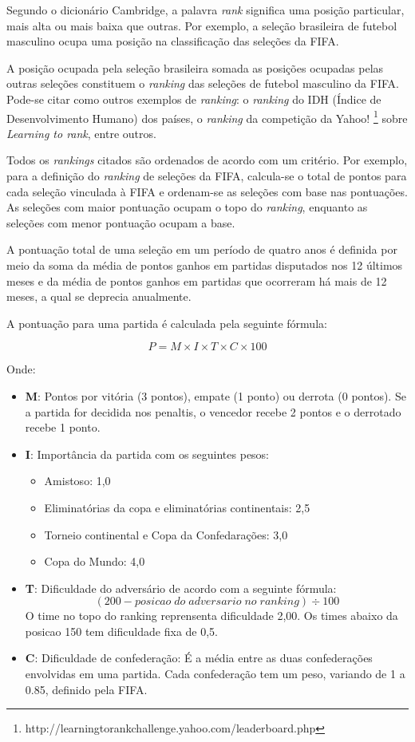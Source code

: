 Segundo o dicionário Cambridge, a palavra \emph{rank} significa uma posição particular, mais alta ou mais baixa que outras. Por exemplo, a seleção brasileira de futebol masculino ocupa uma posição na classificação das seleções da FIFA.

A posição ocupada pela seleção brasileira somada as posições ocupadas pelas outras seleções constituem o \emph{ranking} das seleções de futebol masculino da FIFA. Pode-se citar como outros exemplos de \emph{ranking}: o \emph{ranking} do IDH (Índice de Desenvolvimento Humano) dos países, o \emph{ranking} da competição da Yahoo! \footnote{http://learningtorankchallenge.yahoo.com/leaderboard.php} sobre \emph{Learning to rank}, entre outros.

Todos os \emph{rankings} citados são ordenados de acordo com um critério. Por exemplo, para a definição do \emph{ranking} de seleções da FIFA, calcula-se o total de pontos para cada seleção vinculada à FIFA e ordenam-se as seleções com base nas pontuações. As seleções com maior pontuação ocupam o topo do \emph{ranking}, enquanto as seleções com menor pontuação ocupam a base.

A pontuação total de uma seleção em um período de quatro anos é definida por meio da soma da média de pontos ganhos em partidas disputados nos 12 últimos meses e da média de pontos ganhos em partidas que ocorreram há mais de 12 meses, a qual se deprecia anualmente.

A pontuação para uma partida é calculada pela seguinte fórmula:

\[P = M \times I \times T \times C \times 100\]

Onde:
\begin{itemize}

    \item {\bf M}: Pontos por vitória (3 pontos), empate (1 ponto) ou derrota (0 pontos). Se a partida for decidida nos penaltis, o vencedor recebe 2 pontos e o derrotado recebe 1 ponto.

    \item {\bf I}: Importância da partida com os seguintes pesos:
    \begin{itemize}
        \item Amistoso: 1,0
        \item Eliminatórias da copa e eliminatórias continentais: 2,5
        \item Torneio continental e Copa da Confedarações: 3,0
        \item Copa do Mundo: 4,0
    \end{itemize}

    \item {\bf T}: Dificuldade do adversário de acordo com a seguinte fórmula:
    \[(200 - posicao \; do \; adversario \; no \; ranking) \div 100\]
    O time no topo do ranking reprensenta dificuldade 2,00. Os times abaixo da posicao 150 tem dificuldade fixa de 0,5.

    \item {\bf C}: Dificuldade de confederação: É a média entre as duas confederações envolvidas em uma partida. Cada confederação tem um peso, variando de 1 a 0.85, definido pela FIFA.
    
\end{itemize}

